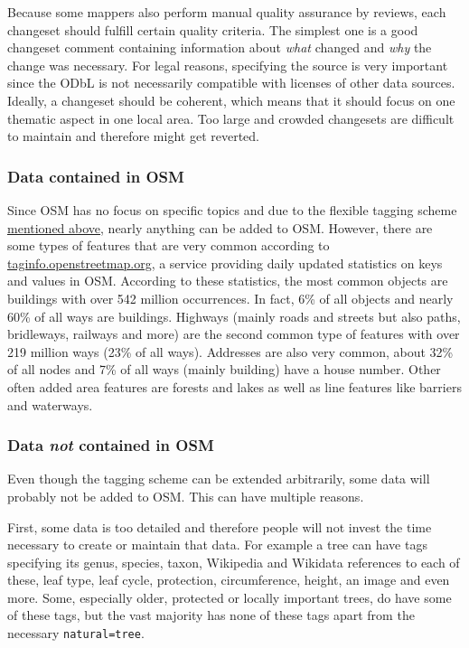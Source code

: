 			Because some mappers also perform manual quality assurance by reviews, each changeset should fulfill certain quality criteria.
			The simplest one is a good changeset comment containing information about \textit{what} changed and \textit{why} the change was necessary.
			For legal reasons, specifying the source is very important since the ODbL is not necessarily compatible with licenses of other data sources.
			Ideally, a changeset should be coherent, which means that it should focus on one thematic aspect in one local area.
			Too large and crowded changesets are difficult to maintain and therefore might get reverted.
			
		\subsubsection{Data contained in OSM}
		
			Since OSM has no focus on specific topics and due to the flexible tagging scheme \hyperref[subsubsec:osm-attributes]{mentioned above}, nearly anything can be added to OSM.
			However, there are some types of features that are very common according to \href{https://taginfo.openstreetmap.org/keys}{taginfo.openstreetmap.org}, a service providing daily updated statistics on keys and values in OSM\cite{taginfo-keys}.
			According to these statistics, the most common objects are buildings with over 542 million occurrences.
			In fact, 6\% of all objects and nearly 60\% of all ways are buildings.
			Highways (mainly roads and streets but also paths, bridleways, railways and more) are the second common type of features with over 219 million ways (23\% of all ways).
			Addresses are also very common, about 32\% of all nodes and 7\% of all ways (mainly building) have a house number.
			Other often added area features are forests and lakes as well as line features like barriers and waterways.
			
		\subsubsection{Data \textit{not} contained in OSM}
		\label{subsubsec:data-not-in-osm}
		
			Even though the tagging scheme can be extended arbitrarily, some data will probably not be added to OSM.
			This can have multiple reasons.
			
			First, some data is too detailed and therefore people will not invest the time necessary to create or maintain that data.
			For example a tree can have tags specifying its genus, species, taxon, Wikipedia and Wikidata references to each of these, leaf type, leaf cycle, protection, circumference, height, an image and even more. Some, especially older, protected or locally important trees, do have some of these tags, but the vast majority has none of these tags apart from the necessary \texttt{natural=tree}.
			
